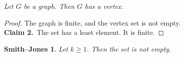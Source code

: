\documentclass{article}
\newtheorem*{bl}{Smith--Jones}
\begin{document}
 {\it Let $G$ be a graph. Then $G$ has a vertex.}

\begin{proof}
The graph is finite, and the vertex set is not empty.\\
{\bf Claim 2.}~The set has a least element.
It is finite.
\end{proof}

\begin{bl}
Let $k\geq 1$. Then the set is not empty.
\end{bl}
\end{document}

